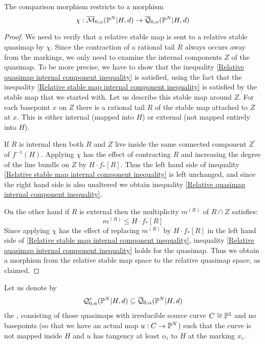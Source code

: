 \begin{lem}\label{lem:comparison}
The comparison morphism restricts to a morphism 
\begin{equation*} \chi: \overline{\mathcal M}_{0,\alpha}(\mathbb P^N|H,d)\rightarrow \overline{\mathcal Q}_{0,\alpha}(\mathbb P^N|H,d) \end{equation*}
\end{lem}
\begin{proof}
We need to verify that a relative stable map is sent to a relative stable quasimap by $\chi$. Since the contraction of a rational tail $R$ always occurs away from the markings, we only need to examine the internal components $Z$ of the quasimap. To be more precise, we have to show that the inequality \eqref{Relative quasimap internal component inequality} is satisfied, using the fact that the inequality \eqref{Relative stable map internal component inequality} is satisfied by the stable map that we started with.  Let us describe this stable map around $Z$. For each basepoint $x$ on $Z$ there is a rational tail $R$ of the stable map attached to $Z$ at $x$. This is either internal (mapped into $H$) or external (not mapped entirely into $H$).  

If $R$ is internal then both $R$ and $Z$ live inside the same connected component $Z^\prime$ of $f^{-1}(H)$. Applying $\chi$ has the effect of contracting $R$ and increasing the degree of the line bundle on $Z$ by $H \cdot f_* [R]$. Thus the left hand side of inequality \eqref{Relative stable map internal component inequality} is left unchanged, and since the right hand side is also unaltered we obtain inequality \eqref{Relative quasimap internal component inequality}.

On the other hand if $R$ is external then the multiplicity $m^{(R)}$ of $R \cap Z$ satisfies:
\begin{equation*} m^{(R)} \leq H \cdot f_* [R] \end{equation*}
Since applying $\chi$ has the effect of replacing $m^{(R)}$ by $H \cdot f_* [R]$ in the left hand side of \eqref{Relative stable map internal component inequality}, inequality \eqref{Relative quasimap internal component inequality} holds for the quasimap. Thus we obtain a morphism from the relative stable map space to the relative quasimap space, as claimed.
\end{proof}
Let us denote by
\begin{equation*} \mathcal Q^{\circ}_{0,\alpha}(\mathbb P^N|H,d) \subseteq \overline{\mathcal Q}_{0,\alpha}(\mathbb P^N|H,d) \end{equation*}
the , consisting of those quasimaps with irreducible source curve $C \cong \mathbb P^1$ and no basepoints (so that we have an actual map $u : C \rightarrow \mathbb P^N$) such that the curve is not mapped inside $H$ and $u$ has tangency at least $\alpha_i$ to $H$ at the marking $x_i$.

